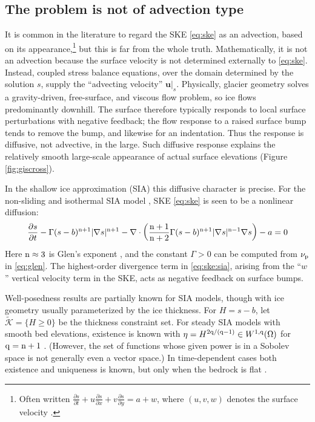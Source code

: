 \documentclass[hidelinks,onefignum,onetabnum,final]{siamart220329}  %
\newcommand{\grad}{\nabla}
\newcommand{\Div}{\nabla\cdot}
\newcommand{\bu}{\mathbf{u}}
\newcommand{\cK}{\mathcal{K}}
\newcommand{\nn}{{\text{\textnormal{n}}}}
\newcommand{\pp}{{\text{\textnormal{p}}}}
\newcommand{\qq}{{\text{\textnormal{q}}}}
\begin{document}
\subsection{The problem is not of advection type} \label{subsec:notadv}  It is common in the literature to regard the SKE \eqref{eq:ske} as an advection, based on its appearance,\footnote{Often written $\frac{\partial s}{\partial t} + u \frac{\partial s}{\partial x} + v \frac{\partial s}{\partial y} = a + w$, where $(u,v,w)$ denotes the surface velocity \cite{GreveBlatter2009,SchoofHewitt2013}.} but this is far from the whole truth.  Mathematically, it is not an advection because the surface velocity is not determined externally to \eqref{eq:ske}.  Instead, coupled stress balance equations, over the domain determined by the solution $s$, supply the ``advecting velocity'' $\bu|_s$.  Physically, glacier geometry solves a gravity-driven, free-surface, and viscous flow problem, so ice flows predominantly downhill.  The surface therefore typically responds to local surface perturbations with negative feedback; the flow response to a raised surface bump tends to remove the bump, and likewise for an indentation.  Thus the response is diffusive, not advective, in the large.  Such diffusive response explains the relatively smooth large-scale appearance of actual surface elevations (Figure \ref{fig:giscross}).

In the shallow ice approximation (SIA) this diffusive character is precise.  For the non-sliding and isothermal SIA model \cite{GreveBlatter2009,JouvetBueler2012}, SKE \eqref{eq:ske} is seen to be a nonlinear diffusion:
\begin{equation}
\frac{\partial s}{\partial t} - \Gamma (s-b)^{\nn+1} |\grad s|^{\nn+1} - \Div \left(\frac{\nn+1}{\nn+2} \Gamma (s-b)^{\nn+1} |\grad s|^{\nn-1} \grad s\right) - a = 0  \label{eq:ske:sia}
\end{equation}
Here $\nn\approx 3$ is Glen's exponent \cite{GreveBlatter2009}, and the constant $\Gamma>0$ can be computed from $\nu_\pp$ in \eqref{eq:glen}.  The highest-order divergence term in \eqref{eq:ske:sia}, arising from the ``$w$'' vertical velocity term in the SKE, acts as negative feedback on surface bumps.

Well-posedness results are partially known for SIA models, though with ice geometry usually parameterized by the ice thickness.  For $H=s-b$, let $\tilde{\cK} = \{H\ge 0\}$ be the thickness constraint set.   For steady SIA models with smooth bed elevations, existence is known with $\eta = H^{2\qq/(\qq-1)} \in W^{1,\qq}(\Omega)$ for $\qq=\nn+1$ \cite{JouvetBueler2012}.  (However, the set of functions whose given power is in a Sobolev space is not generally even a vector space.)  In time-dependent cases both existence and uniqueness is known, but only when the bedrock is flat \cite{Calvoetal2003,PiersantiTemam2023}.
\end{document}
